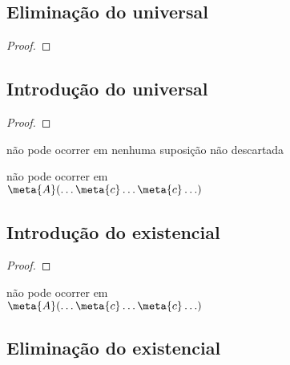 \begin{multicols}{2}
\subsection*{Eliminação do universal}

\begin{proof}
	 
\end{proof}

\subsection*{Introdução do universal}

\begin{proof}
	 
\end{proof}

\medskip\begin{raggedright}
 não pode ocorrer em nenhuma suposição não descartada

 não pode ocorrer em\\ $\meta{A}(\ldots \meta{c} \ldots \meta{c}\ldots)$
\end{raggedright}

\subsection*{Introdução do existencial}

\begin{proof}
\end{proof}

\medskip\begin{raggedright}
\noindent {} não pode ocorrer em\\ $\meta{A}(\ldots \meta{c} \ldots \meta{c}\ldots)$
\end{raggedright}

\subsection*{Eliminação do existencial}


\end{multicols}
